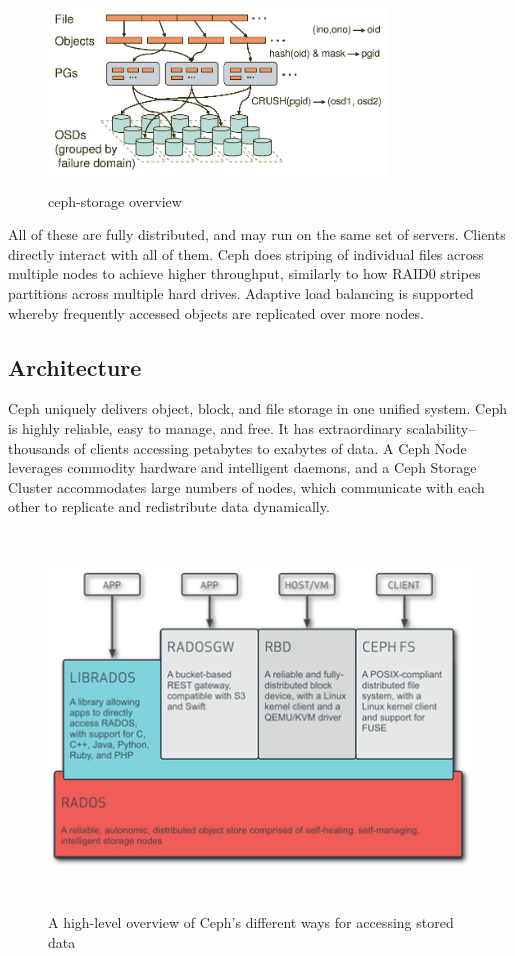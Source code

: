 \documentclass[a4paper,10pt]{article}
\begin{document}
\begin{figure}[!htb]
\centering
\includegraphics[width=9cm,height=5cm]{images/osd}
\caption[Long caption]{ ceph-storage overview }
\end{figure}

    All of these are fully distributed, and may run on the same set of servers. Clients directly interact with all of them. Ceph does striping of individual files across multiple nodes to achieve higher throughput, similarly to how RAID0 stripes partitions across multiple hard drives. Adaptive load balancing is supported whereby frequently accessed objects are replicated over more nodes.

\subsection{Architecture}

    Ceph uniquely delivers object, block, and file storage in one unified system. Ceph is highly reliable, easy to manage, and free. It has extraordinary scalability–thousands of clients accessing petabytes to exabytes of data. A Ceph Node leverages commodity hardware and intelligent daemons, and a Ceph Storage Cluster accommodates large numbers of nodes, which communicate with each other to replicate and redistribute data dynamically.

\begin{figure}[!htb]
\includegraphics[width=12cm,height=10cm]{images/Ceph-view}
\caption[Long caption]{A high-level overview of Ceph's different ways for accessing stored data}
\end{figure}
\end{document}
